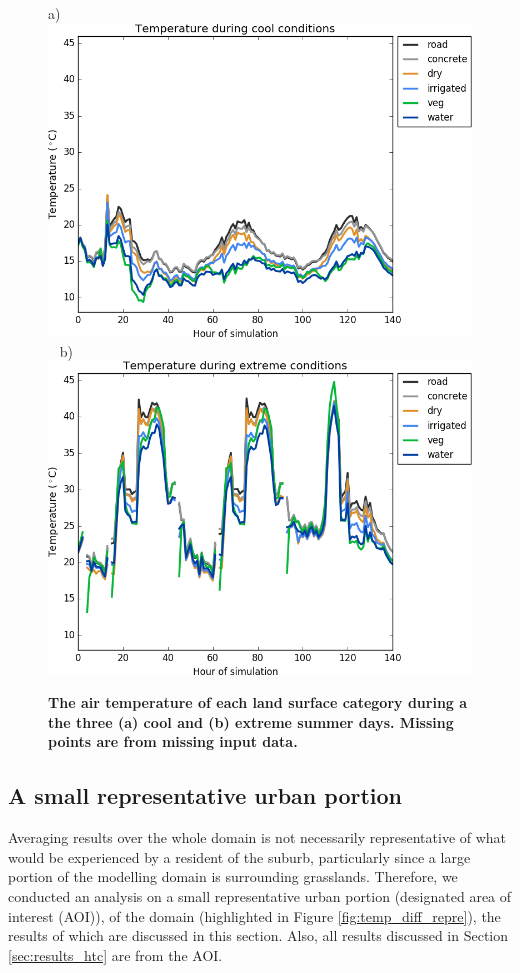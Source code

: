 \documentclass[final,3p,times,authoryear]{elsarticle}
\begin{document}
\begin{figure}[!htbp]
\centering   
a)\includegraphics[scale=0.40]{images/fig1a}
~
b)\includegraphics[scale=0.40]{images/fig1b} 
\caption{\bf The air temperature of each land surface category during a the three (a) cool and (b) extreme summer days. Missing points are from missing input data.}    
 \label{fig:surface_air_temps} 
\end{figure} 


\subsection{A small representative urban portion}\label{sec:result_rep_urban}
Averaging results over the whole domain is not necessarily representative of what would be experienced by a resident of the suburb, particularly since a large portion of the modelling domain is surrounding grasslands. Therefore, we conducted an analysis on a small representative urban portion (designated area of interest (AOI)), of the domain (highlighted in Figure \ref{fig:temp_diff_repre}), the results of which are discussed in this section. Also, all results discussed in Section \ref{sec:results_htc} are from the AOI.
\end{document}
